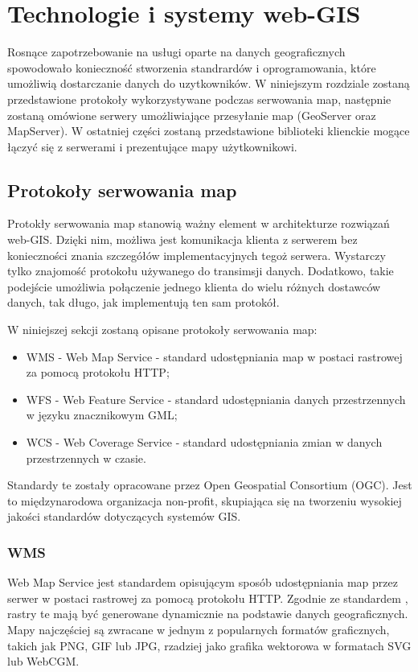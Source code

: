 \chapter{Technologie i systemy web-GIS}
Rosnące zapotrzebowanie na usługi oparte na danych geograficznych spowodowało konieczność stworzenia standrardów i oprogramowania,
które umożliwią dostarczanie danych do uzytkowników. 
W niniejszym rozdziale zostaną przedstawione protokoły wykorzystywane podczas serwowania map, następnie zostaną omówione serwery
umożliwiające przesyłanie map (GeoServer oraz MapServer).
W ostatniej części zostaną przedstawione biblioteki klienckie mogące łączyć się z serwerami i prezentujące mapy użytkownikowi.

\section{Protokoły serwowania map}
\label{chap:protokoly}

Protokły serwowania map stanowią ważny element w architekturze rozwiązań web-GIS. Dzięki nim, możliwa jest komunikacja
klienta z serwerem bez konieczności znania szczegółów implementacyjnych tegoż serwera. Wystarczy tylko znajomość
protokołu używanego do transimsji danych. Dodatkowo, takie podejście umożliwia połączenie jednego klienta do wielu
różnych dostawców danych, tak długo, jak implementują ten sam protokół.

W niniejszej sekcji zostaną opisane protokoły serwowania map:
\begin{itemize}
\item WMS - Web Map Service - standard udostępniania map w postaci rastrowej za pomocą protokołu HTTP;
\item WFS - Web Feature Service - standard udostępniania danych przestrzennych w języku znacznikowym GML;
\item WCS - Web Coverage Service - standard udostępniania zmian w danych przestrzennych w czasie.
\end{itemize}

Standardy te zostały opracowane przez Open Geospatial Consortium (OGC). Jest to międzynarodowa organizacja non-profit, skupiająca się na tworzeniu wysokiej jakości standardów dotyczących systemów GIS.

\subsection{WMS}
Web Map Service jest standardem opisującym sposób udostępniania map przez serwer w postaci rastrowej za pomocą protokołu HTTP.
Zgodnie ze standardem \cite{OpenGIS_WMS2006}, rastry te mają być generowane dynamicznie na podstawie danych geograficznych.
Mapy najczęściej są zwracane w jednym z popularnych formatów graficznych, takich jak PNG, GIF lub JPG, rzadziej jako grafika wektorowa w formatach SVG lub WebCGM.

